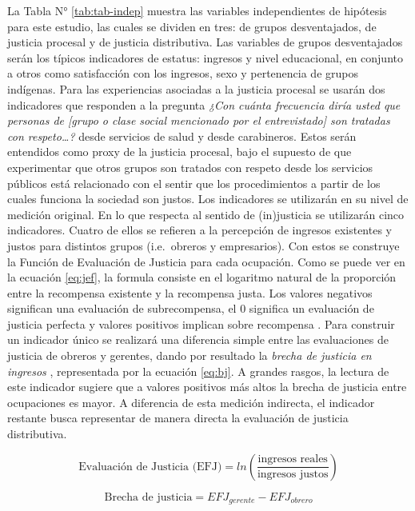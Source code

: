 \documentclass[12pt,twoside]{templates/facsothesis}
\begin{document}
La Tabla N° \ref{tab:tab-indep} muestra las variables independientes de hipótesis para este estudio, las cuales se dividen en tres: de grupos desventajados, de justicia procesal y de justicia distributiva. Las variables de grupos desventajados serán los típicos indicadores de estatus: ingresos y nivel educacional, en conjunto a otros como satisfacción con los ingresos, sexo y pertenencia de grupos indígenas. Para las experiencias asociadas a la justicia procesal se usarán dos indicadores que responden a la pregunta \emph{¿Con cuánta frecuencia diría usted que personas de {[}grupo o clase social mencionado por el entrevistado{]} son tratadas con respeto\ldots?} desde servicios de salud y desde carabineros. Estos serán entendidos como proxy de la justicia procesal, bajo el supuesto de que experimentar que otros grupos son tratados con respeto desde los servicios públicos está relacionado con el sentir que los procedimientos a partir de los cuales funciona la sociedad son justos. Los indicadores se utilizarán en su nivel de medición original. En lo que respecta al sentido de (in)justicia se utilizarán cinco indicadores. Cuatro de ellos se refieren a la percepción de ingresos existentes y justos para distintos grupos (i.e.~obreros y empresarios). Con estos se construye la Función de Evaluación de Justicia para cada ocupación. Como se puede ver en la ecuación \eqref{eq:jef}, la formula consiste en el logaritmo natural de la proporción entre la recompensa existente y la recompensa justa. Los valores negativos significan una evaluación de subrecompensa, el 0 significa un evaluación de justicia perfecta y valores positivos implican sobre recompensa \citep{Jasso1980}. Para construir un indicador único se realizará una diferencia simple entre las evaluaciones de justicia de obreros y gerentes, dando por resultado la \emph{brecha de justicia en ingresos} \citep{Verwiebe2000}, representada por la ecuación \eqref{eq:bj}. A grandes rasgos, la lectura de este indicador sugiere que a valores positivos más altos la brecha de justicia entre ocupaciones es mayor. A diferencia de esta medición indirecta, el indicador restante busca representar de manera directa la evaluación de justicia distributiva.

\begin{equation}
   \text{Evaluación de Justicia (EFJ)}= ln(\frac{\text{ingresos reales}}{\text{ingresos justos}}) \label{eq:jef}
\end{equation}

\begin{equation}
   \text{Brecha de justicia}= EFJ_{gerente} - EFJ_{obrero} \label{eq:bj}
\end{equation}
\end{document}

